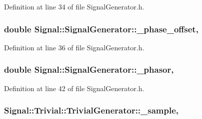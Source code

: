 Definition at line 34 of file Signal\+Generator.\+h.

\hypertarget{classSignal_1_1SignalGenerator_a6b4444d46747c8517171edbbf4b5588f}{
\subsubsection[{\+\_\+phase\+\_\+offset}]{\setlength{\rightskip}{0pt plus 5cm}double Signal\+::\+Signal\+Generator\+::\+\_\+phase\+\_\+offset\hspace{0.3cm}{\ttfamily [protected]}, {\ttfamily [inherited]}}}\label{classSignal_1_1SignalGenerator_a6b4444d46747c8517171edbbf4b5588f}


Definition at line 36 of file Signal\+Generator.\+h.

\hypertarget{classSignal_1_1SignalGenerator_af4aa0728ded00777be26a06d883eaeb3}{
\subsubsection[{\+\_\+phasor}]{\setlength{\rightskip}{0pt plus 5cm}double Signal\+::\+Signal\+Generator\+::\+\_\+phasor\hspace{0.3cm}{\ttfamily [protected]}, {\ttfamily [inherited]}}}\label{classSignal_1_1SignalGenerator_af4aa0728ded00777be26a06d883eaeb3}


Definition at line 42 of file Signal\+Generator.\+h.

\hypertarget{classSignal_1_1Trivial_1_1TrivialGenerator_a2e43e1ae605338b92e48974a681866e9}{
\subsubsection[{\+\_\+sample}]{ Signal\+::\+Trivial\+::\+Trivial\+Generator\+::\+\_\+sample\hspace{0.3cm}{\ttfamily [protected]}, {\ttfamily [inherited]}}}\label{classSignal_1_1Trivial_1_1TrivialGenerator_a2e43e1ae605338b92e48974a681866e9}


